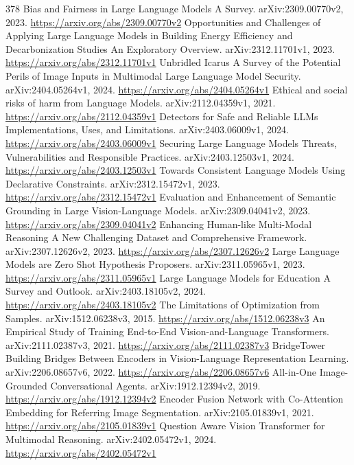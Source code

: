 \documentclass[11pt]{article}
\begin{document}
\begin{thebibliography}{378}
 Bias and Fairness in Large Language Models A Survey. arXiv:2309.00770v2, 2023. \url{https://arxiv.org/abs/2309.00770v2}
 Opportunities and Challenges of Applying Large Language Models in Building Energy Efficiency and Decarbonization Studies An Exploratory Overview. arXiv:2312.11701v1, 2023. \url{https://arxiv.org/abs/2312.11701v1}
 Unbridled Icarus A Survey of the Potential Perils of Image Inputs in Multimodal Large Language Model Security. arXiv:2404.05264v1, 2024. \url{https://arxiv.org/abs/2404.05264v1}
 Ethical and social risks of harm from Language Models. arXiv:2112.04359v1, 2021. \url{https://arxiv.org/abs/2112.04359v1}
 Detectors for Safe and Reliable LLMs Implementations, Uses, and Limitations. arXiv:2403.06009v1, 2024. \url{https://arxiv.org/abs/2403.06009v1}
 Securing Large Language Models Threats, Vulnerabilities and Responsible Practices. arXiv:2403.12503v1, 2024. \url{https://arxiv.org/abs/2403.12503v1}
 Towards Consistent Language Models Using Declarative Constraints. arXiv:2312.15472v1, 2023. \url{https://arxiv.org/abs/2312.15472v1}
 Evaluation and Enhancement of Semantic Grounding in Large Vision-Language Models. arXiv:2309.04041v2, 2023. \url{https://arxiv.org/abs/2309.04041v2}
 Enhancing Human-like Multi-Modal Reasoning A New Challenging Dataset and Comprehensive Framework. arXiv:2307.12626v2, 2023. \url{https://arxiv.org/abs/2307.12626v2}
 Large Language Models are Zero Shot Hypothesis Proposers. arXiv:2311.05965v1, 2023. \url{https://arxiv.org/abs/2311.05965v1}
 Large Language Models for Education A Survey and Outlook. arXiv:2403.18105v2, 2024. \url{https://arxiv.org/abs/2403.18105v2}
 The Limitations of Optimization from Samples. arXiv:1512.06238v3, 2015. \url{https://arxiv.org/abs/1512.06238v3}
 An Empirical Study of Training End-to-End Vision-and-Language Transformers. arXiv:2111.02387v3, 2021. \url{https://arxiv.org/abs/2111.02387v3}
 BridgeTower Building Bridges Between Encoders in Vision-Language Representation Learning. arXiv:2206.08657v6, 2022. \url{https://arxiv.org/abs/2206.08657v6}
 All-in-One Image-Grounded Conversational Agents. arXiv:1912.12394v2, 2019. \url{https://arxiv.org/abs/1912.12394v2}
 Encoder Fusion Network with Co-Attention Embedding for Referring Image Segmentation. arXiv:2105.01839v1, 2021. \url{https://arxiv.org/abs/2105.01839v1}
 Question Aware Vision Transformer for Multimodal Reasoning. arXiv:2402.05472v1, 2024. \url{https://arxiv.org/abs/2402.05472v1}

\end{thebibliography}
\end{document}
